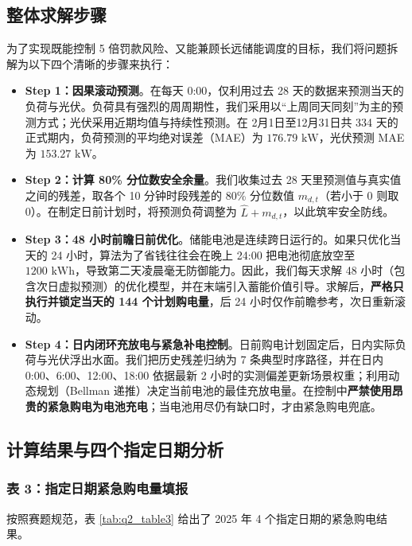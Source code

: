\documentclass[withoutpreface]{cumcmthesis}
\begin{document}
\subsection{整体求解步骤}
为了实现既能控制 5 倍罚款风险、又能兼顾长远储能调度的目标，我们将问题拆解为以下四个清晰的步骤来执行：

\begin{itemize}
    \item \textbf{Step 1：因果滚动预测}。在每天 0:00，仅利用过去 28 天的数据来预测当天的负荷与光伏。负荷具有强烈的周周期性，我们采用以“上周同天同刻”为主的预测方式；光伏采用近期均值与持续性预测。在 2月1日至12月31日共 334 天的正式期内，负荷预测的平均绝对误差（MAE）为 $176.79\text{ kW}$，光伏预测 MAE 为 $153.27\text{ kW}$。
    
    \item \textbf{Step 2：计算 80\% 分位数安全余量}。我们收集过去 28 天里预测值与真实值之间的残差，取各个 10 分钟时段残差的 80\% 分位数值 $m_{d,t}$（若小于 0 则取 0）。在制定日前计划时，将预测负荷调整为 $\widehat{L} + m_{d,t}$，以此筑牢安全防线。
    
    \item \textbf{Step 3：48 小时前瞻日前优化}。储能电池是连续跨日运行的。如果只优化当天的 24 小时，算法为了省钱往往会在晚上 24:00 把电池彻底放空至 $1200\text{ kWh}$，导致第二天凌晨毫无防御能力。因此，我们每天求解 48 小时（包含次日虚拟预测）的优化模型，并在末端引入蓄能价值引导。求解后，\textbf{严格只执行并锁定当天的 144 个计划购电量}，后 24 小时仅作前瞻参考，次日重新滚动。
    
    \item \textbf{Step 4：日内闭环充放电与紧急补电控制}。日前购电计划固定后，日内实际负荷与光伏浮出水面。我们把历史残差归纳为 7 条典型时序路径，并在日内 0:00、6:00、12:00、18:00 依据最新 2 小时的实测偏差更新场景权重；利用动态规划（Bellman 递推）决定当前电池的最佳充放电量。在控制中\textbf{严禁使用昂贵的紧急购电为电池充电}；当电池用尽仍有缺口时，才由紧急购电兜底。
\end{itemize}

\subsection{计算结果与四个指定日期分析}

\subsubsection{表 3：指定日期紧急购电量填报}
按照赛题规范，表 \ref{tab:q2_table3} 给出了 2025 年 4 个指定日期的紧急购电结果。
\end{document}
